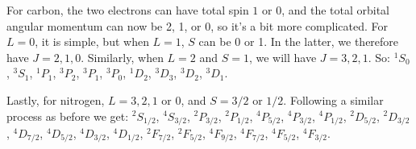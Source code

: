 \begin{parts}
  For carbon, the two electrons can have total spin $1$ or $0$, and the total orbital angular momentum can now be 2, 1, or 0, so it's a bit more complicated. For $L=0$, it is simple, but when $L=1$, $S$ can be 0 or 1. In the latter, we therefore have $J=2,1,0$. Similarly, when $L=2$ and $S=1$, we will have $J=3,2,1$. So: $^1 S_0$, $^3 S_1$, $^1 P_1$, $^3 P_2$, $^3 P_1$, $^3 P_0$, $^1 D_2$, $^3 D_3$, $^3 D_2$, $^3 D_1$.

  Lastly, for nitrogen, $L=3,2,1$ or 0, and $S=3/2$ or $1/2$. Following a similar process as before we get: $^2 S_{1/2}$, $^4 S_{3/2}$, $^2 P_{3/2}$, $^2 P_{1/2}$, $^4 P_{5/2}$, $^4 P_{3/2}$, $^4 P_{1/2}$, $^2 D_{5/2}$, $^2 D_{3/2}$, $^4 D_{7/2}$, $^4 D_{5/2}$, $^4 D_{3/2}$, $^4 D_{1/2}$, $^2 F_{7/2}$, $^2 F_{5/2}$, $^4 F_{9/2}$, $^4 F_{7/2}$, $^4 F_{5/2}$, $^4 F_{3/2}$.
  
\end{parts}





